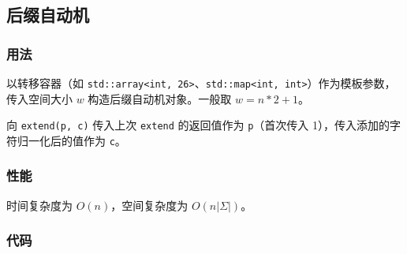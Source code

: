 \subsection{后缀自动机}

\subsubsection{用法}

以转移容器（如 \lstinline{std::array<int, 26>}、\lstinline{std::map<int, int>}）作为模板参数，传入空间大小 $w$ 构造后缀自动机对象。一般取 $w = n * 2 + 1$。

向 \lstinline{extend(p, c)} 传入上次 \lstinline{extend} 的返回值作为 \lstinline{p}（首次传入 1），传入添加的字符归一化后的值作为 \lstinline{c}。

\subsubsection{性能}

时间复杂度为 $O(n)$，空间复杂度为 $O(n |\Sigma|)$。

\subsubsection{代码}


